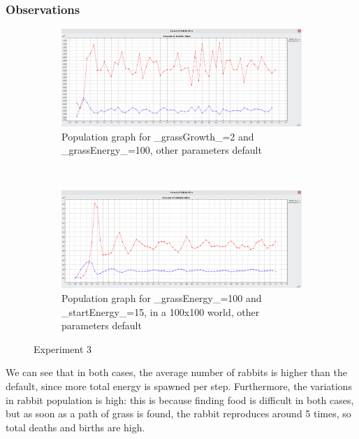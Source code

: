 \documentclass[11pt]{article}
\begin{document}
\subsubsection{Observations}
\begin{figure}[h]
    \centering
    \begin{subfigure}{\textwidth}
        \includegraphics[width = \textwidth]{growth-2-energy-100}
        \caption{Population graph for _grassGrowth_=2 and _grassEnergy_=100, other parameters default}
        \label{fig:growth-2-energy-100}
    \end{subfigure}
    ~
    \begin{subfigure}{\textwidth}
        \includegraphics[width = \textwidth]{energy-100-startEnergy-15-world-100-100}
        \caption{Population graph for _grassEnergy_=100 and _startEnergy_=15, in a 100x100 world, other parameters default}
        \label{fig:energy-100-startEnergy-15-world-100-100}
    \end{subfigure}
    \caption{Experiment 3}\label{fig:exp-3}
\end{figure}

We can see that in both cases, the average number of rabbits is higher than the default, since more total energy is spawned per step. Furthermore, the variations in rabbit population is high: this is because finding food is difficult in both cases, but as soon as a path of grass is found, the rabbit reproduces around 5 times, so total deaths and births are high.
\end{document}
